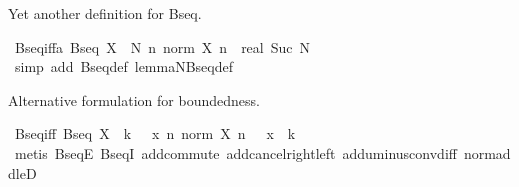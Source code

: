 \begin{isabellebody}
\isamarkupfalse%
%
\endisatagproof
{\isafoldproof}%
%
\isadelimproof
%
\endisadelimproof
%
\begin{isamarkuptext}%
Yet another definition for Bseq.%
\end{isamarkuptext}\isamarkuptrue%
\isamarkupfalse%
\ Bseq{\isacharunderscore}{\kern0pt}iff{}a{\isacharcolon}{\kern0pt}\ {\isachardoublequoteopen}Bseq\ X\ {\isasymlongleftrightarrow}\ {\isacharparenleft}{\kern0pt}{\isasymexists}N{\isachardot}{\kern0pt}\ {\isasymforall}n{\isachardot}{\kern0pt}\ norm\ {\isacharparenleft}{\kern0pt}X\ n{\isacharparenright}{\kern0pt}\ {\isacharless}{\kern0pt}\ real\ {\isacharparenleft}{\kern0pt}Suc\ N{\isacharparenright}{\kern0pt}{\isacharparenright}{\kern0pt}{\isachardoublequoteclose}\isanewline
%
\isadelimproof
\ \ %
\endisadelimproof
%
\isatagproof
{}\isamarkupfalse%
\ {\isacharparenleft}{\kern0pt}simp\ add{\isacharcolon}{\kern0pt}\ Bseq{\isacharunderscore}{\kern0pt}def\ lemma{\isacharunderscore}{\kern0pt}NBseq{\isacharunderscore}{\kern0pt}def{}{\isacharparenright}{\kern0pt}%
\endisatagproof
{\isafoldproof}%
%
\isadelimproof
%
\endisadelimproof
%
\isadelimdocument
%
\endisadelimdocument
%
\isatagdocument
%
\isamarkuptrue%
%
\endisatagdocument
{\isafolddocument}%
%
\isadelimdocument
%
\endisadelimdocument
%
\begin{isamarkuptext}%
Alternative formulation for boundedness.%
\end{isamarkuptext}\isamarkuptrue%
\isamarkupfalse%
\ Bseq{\isacharunderscore}{\kern0pt}iff{}{\isacharcolon}{\kern0pt}\ {\isachardoublequoteopen}Bseq\ X\ {\isasymlongleftrightarrow}\ {\isacharparenleft}{\kern0pt}{\isasymexists}k\ {\isachargreater}{\kern0pt}\ {}{\isachardot}{\kern0pt}\ {\isasymexists}x{\isachardot}{\kern0pt}\ {\isasymforall}n{\isachardot}{\kern0pt}\ norm\ {\isacharparenleft}{\kern0pt}X\ n\ {\isacharplus}{\kern0pt}\ {\isacharminus}{\kern0pt}\ x{\isacharparenright}{\kern0pt}\ {\isasymle}\ k{\isacharparenright}{\kern0pt}{\isachardoublequoteclose}\isanewline
%
\isadelimproof
\ \ %
\endisadelimproof
%
\isatagproof
{}\isamarkupfalse%
\ {\isacharparenleft}{\kern0pt}metis\ BseqE\ BseqI{\isacharprime}{\kern0pt}\ add{\isachardot}{\kern0pt}commute\ add{\isacharunderscore}{\kern0pt}cancel{\isacharunderscore}{\kern0pt}right{\isacharunderscore}{\kern0pt}left\ add{\isacharunderscore}{\kern0pt}uminus{\isacharunderscore}{\kern0pt}conv{\isacharunderscore}{\kern0pt}diff\ norm{\isacharunderscore}{\kern0pt}add{\isacharunderscore}{\kern0pt}leD\isanewline

\end{isabellebody}
